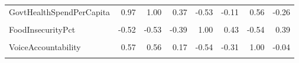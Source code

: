 \documentclass[
]{article}
\begin{document}
\begin{table}
{\begin{tabular}[t]{lrrrrrrr}
\addlinespace
GovtHealthSpendPerCapita & 0.97 & 1.00 & 0.37 & -0.53 & -0.11 & 0.56 & -0.26\\
\cellcolor{gray!10}{MigrantsPct} & \cellcolor{gray!10}{0.38} & \cellcolor{gray!10}{0.37} & \cellcolor{gray!10}{1.00} & \cellcolor{gray!10}{-0.39} & \cellcolor{gray!10}{-0.05} & \cellcolor{gray!10}{0.17} & \cellcolor{gray!10}{-0.21}\\
FoodInsecurityPct & -0.52 & -0.53 & -0.39 & 1.00 & 0.43 & -0.54 & 0.39\\
\cellcolor{gray!10}{RuralPopulGrowth} & \cellcolor{gray!10}{-0.10} & \cellcolor{gray!10}{-0.11} & \cellcolor{gray!10}{-0.05} & \cellcolor{gray!10}{0.43} & \cellcolor{gray!10}{1.00} & \cellcolor{gray!10}{-0.31} & \cellcolor{gray!10}{0.01}\\
VoiceAccountability & 0.57 & 0.56 & 0.17 & -0.54 & -0.31 & 1.00 & -0.04\\
\addlinespace
\cellcolor{gray!10}{Homicides} & \cellcolor{gray!10}{-0.24} & \cellcolor{gray!10}{-0.26} & \cellcolor{gray!10}{-0.21} & \cellcolor{gray!10}{0.39} & \cellcolor{gray!10}{0.01} & \cellcolor{gray!10}{-0.04} & \cellcolor{gray!10}{1.00}\\
\bottomrule
\end{tabular}}
\end{table}
\end{document}
